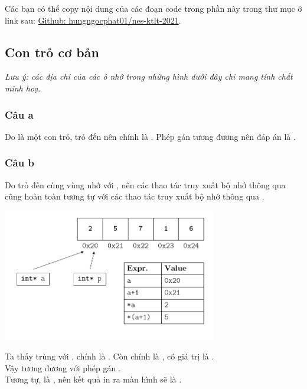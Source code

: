 \documentclass[main.tex]{subfiles}
\begin{document}
Các bạn có thể copy nội dung của các đoạn code trong phần này trong thư mục  ở link sau: \href{https://github.com/hungngocphat01/nes-ktlt-2021}{Github: hungngocphat01/nes-ktlt-2021}.
\subsection{Con trỏ cơ bản}
\textit{Lưu ý: các địa chỉ của các ô nhớ trong những hình dưới đây chỉ mang tính chất minh hoạ}.

\subsubsection{Câu a}
Do  là một con trỏ, trỏ đến  nên  chính là . Phép gán  tương đương  nên đáp án là .

\subsubsection{Câu b}
Do  trỏ đến cùng vùng nhớ với , nên các thao tác truy xuất bộ nhớ thông qua  cũng hoàn toàn tương tự với các thao tác truy xuất bộ nhớ thông qua .

\begin{center}
\includegraphics[width=0.7\textwidth]{image/ans_CTRLCB_b.png}
\end{center}

Ta thấy  trùng với , chính là . Còn  chính là , có giá trị là .\\
Vậy  tương đương với phép gán .\\
Tương tự,  là , nên kết quả in ra màn hình sẽ là .
\end{document}
